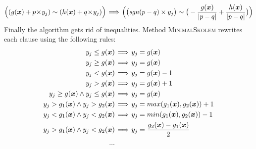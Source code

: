 \begin{equation}
{\Big( (g(\vx)+ p\!\times\!y_j}) \sim ( {h(\vx) + q\!\times\!y_j})\Big) \!\implies\! \Big(\big(\mathit{sgn}(p-q)\times y_j \big) \sim \big( -\frac{g(\vx)}{|p-q|} + \frac{h(\vx)}{|p-q|} \big)\Big)  \notag
\end{equation}
Finally the algorithm gets rid of inequalities.
Method \textsc{MinimalSkolem} rewrites each clause using the following rules:
\begin{align}
     y_j \le g (\vx) &\!\implies\! y_j = g (\vx)  \notag \\
     y_j \ge g (\vx) &\!\implies\! y_j = g (\vx)  \notag \\
     y_j < g (\vx) &\!\implies\! y_j = g (\vx) - 1 \notag \\
     y_j > g (\vx) &\!\implies\! y_j = g (\vx) + 1  \notag \\
     y_j \ge g (\vx) \land y_j \le g (\vx) &\!\implies\! y_j = g (\vx)  \notag \\
     y_j > g_1 (\vx) \land y_j > g_2 (\vx) &\!\implies\! y_j = max(g_1 (\vx), g_2(\vx)) + 1  \notag \\
     y_j < g_1 (\vx) \land y_j < g_2 (\vx) &\!\implies\! y_j = min(g_1 (\vx), g_2(\vx)) - 1  \notag \\
     y_j > g_1 (\vx) \land y_j < g_2 (\vx) &\!\implies\! y_j = \frac{g_2 (\vx) - g_1(\vx)} {2}  \notag \\
     ...
\end{align}



